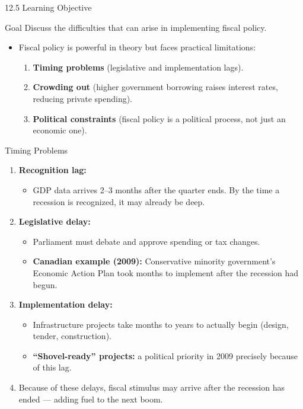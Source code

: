 \documentclass[aspectratio=169]{beamer}
\begin{document}
\begin{frame}{12.5 Learning Objective}
\transfade
\begin{block}{Goal}
Discuss the difficulties that can arise in implementing fiscal policy.
\end{block}
\begin{itemize}
  \item Fiscal policy is powerful in theory but faces practical limitations:
  \begin{enumerate}
    \item \textbf{Timing problems} (legislative and implementation lags).
    \item \textbf{Crowding out} (higher government borrowing raises interest rates, reducing private spending).
    \item \textbf{Political constraints} (fiscal policy is a political process, not just an economic one).
  \end{enumerate}
\end{itemize}
\end{frame}

\begin{frame}{Timing Problems}
\transfade
\begin{enumerate}
  \item \textbf{Recognition lag:}
  \begin{itemize}
    \item GDP data arrives 2--3 months after the quarter ends. By the time a recession is recognized, it may already be deep.
  \end{itemize}
  \item \textbf{Legislative delay:}
  \begin{itemize}
    \item Parliament must debate and approve spending or tax changes.
    \item \textbf{Canadian example (2009):} Conservative minority government's Economic Action Plan took months to implement after the recession had begun.
  \end{itemize}
  \item \textbf{Implementation delay:}
  \begin{itemize}
    \item Infrastructure projects take months to years to actually begin (design, tender, construction).
    \item \textbf{``Shovel-ready'' projects:} a political priority in 2009 precisely because of this lag.
  \end{itemize}
  \item Because of these delays, fiscal stimulus may arrive \alert{after the recession has ended} --- adding fuel to the next boom.
\end{enumerate}
\end{frame}
\end{document}
